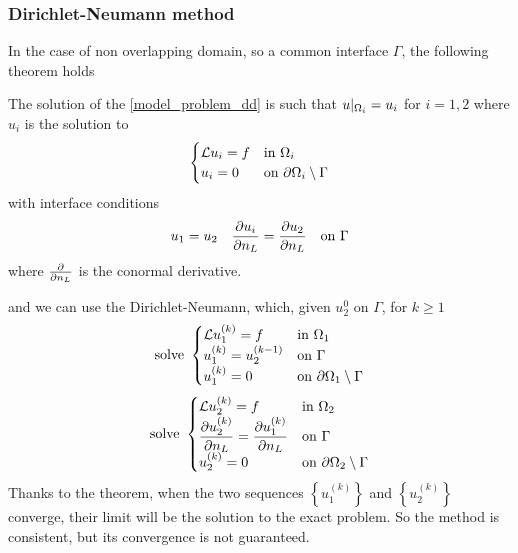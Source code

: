 \subsubsection*{Dirichlet-Neumann method}
In the case of non overlapping domain, so a common interface \(\Gamma\), the following theorem holds 
\begin{theorem}
    The solution of the \eqref{model_problem_dd} is such that \(u\vert_{\Omega_i} = u_i\) for \(i=1,2\) where \(u_i\) is the solution to 
    \begin{equation*}
        \begin{cases}
            \mathcal{L} u_i = f & \text{in } \Omega_i \\
            u_i = 0 & \text{on } {\partial\Omega}_i \setminus \Gamma
        \end{cases}
    \end{equation*}
    with interface conditions
    \begin{equation*}
        u_1 =  u_2 \quad \partialderivative{u_i}{n_L} = \partialderivative{u_2}{n_L} \quad \txt{on } \Gamma
    \end{equation*}
    where \(\pderivative{n_L}\) is the conormal derivative.
\end{theorem}
and we can use the Dirichlet-Neumann, which, given \(u_2^0\) on \(\Gamma\), for \(k \geq 1\) 
\begin{equation*}
    \text{solve }\begin{cases}
        \mathcal{L} u^{(k)}_1 = f & \text{in } \Omega_1 \\
        u^{(k)}_1 = u^{(k-1)}_2 & \text{on } \Gamma \\
        u^{(k)}_1 = 0 & \text{on } {\partial\Omega}_1\setminus \Gamma
    \end{cases}
\end{equation*}
\begin{equation*}
    \txt{solve }\begin{cases}
        \loperator u^{(k)}_2 = f & \txt{in } \Omega_2 \\
        \displaystyle \partialderivative{u^{(k)}_2}{n_L} = \partialderivative{u_1^{(k)}}{n_L} & \txt{on } \Gamma \\
        u^{(k)}_2 = 0 & \txt{on } \boundary_2\setminus \Gamma
    \end{cases}
\end{equation*}
Thanks to the theorem, when the two sequences \(\left\{ u^{(k)}_1 \right\}\) and \(\left\{ u^{(k)}_2 \right\}\) converge, their limit will be the solution to the exact problem. So the method is consistent, but its convergence is not guaranteed.

